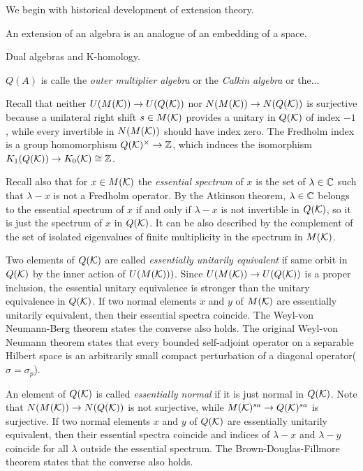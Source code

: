 \documentclass{../../large}
\begin{document}
We begin with historical development of extension theory.

An extension of an algebra is an analogue of an embedding of a space.

Dual algebras and K-homology.

$Q(A)$ is calle the \emph{outer multiplier algebra} or the \emph{Calkin algebra} or the...

\begin{prb}

Recall that neither $U(M(\mathcal{K}))\to U(Q(\mathcal{K}))$ nor $N(M(\mathcal{K}))\to N(Q(\mathcal{K}))$ is surjective because a unilateral right shift $s\in M(\mathcal{K})$ provides a unitary in $Q(\mathcal{K})$ of index $-1$, while every invertible in $N(M(\mathcal{K}))$ should have index zero.
The Fredholm index is a group homomorphism $Q(\mathcal{K})^\times\to\mathbb{Z}$, which induces the isomorphism $K_1(Q(\mathcal{K}))\to K_0(\mathcal{K})\cong\mathbb{Z}$.

Recall also that for $x\in M(\mathcal{K})$ the \emph{essential spectrum} of $x$ is the set of $\lambda\in\mathbb{C}$ such that $\lambda-x$ is not a Fredholm operator.
By the Atkinson theorem, $\lambda\in\mathbb{C}$ belongs to the essential spectrum of $x$ if and only if $\lambda-x$ is not invertible in $Q(\mathcal{K})$, so it is just the spectrum of $x$ in $Q(\mathcal{K})$.
It can be also described by the complement of the set of isolated eigenvalues of finite multiplicity in the spectrum in $M(\mathcal{K})$.

Two elements of $Q(\mathcal{K})$ are called \emph{essentially unitarily equivalent} if same orbit in $Q(\mathcal{K})$ by the inner action of $U(M(\mathcal{K})))$.
Since $U(M(\mathcal{K}))\to U(Q(\mathcal{K}))$ is a proper inclusion, the essential unitary equivalence is stronger than the unitary equivalence in $Q(\mathcal{K})$.
If two normal elements $x$ and $y$ of $M(\mathcal{K})$ are essentially unitarily equivalent, then their essential spectra coincide.
The Weyl-von Neumann-Berg theorem states the converse also holds.
The original Weyl-von Neumann theorem states that every bounded self-adjoint operator on a separable Hilbert space is an arbitrarily small compact perturbation of a diagonal operator($\sigma=\sigma_p$).

An element of $Q(\mathcal{K})$ is called \emph{essentially normal} if it is just normal in $Q(\mathcal{K})$.
Note that $N(M(\mathcal{K}))\to N(Q(\mathcal{K}))$ is not surjective, while $M(\mathcal{K})^{sa}\to Q(\mathcal{K})^{sa}$ is surjective.
If two normal elements $x$ and $y$ of $Q(\mathcal{K})$ are essentially unitarily equivalent, then their essential spectra coincide and indices of $\lambda-x$ and $\lambda-y$ coincide for all $\lambda$ outside the essential spectrum.
The Brown-Douglas-Fillmore theorem states that the converse also holds.


\end{prb}
\end{document}
